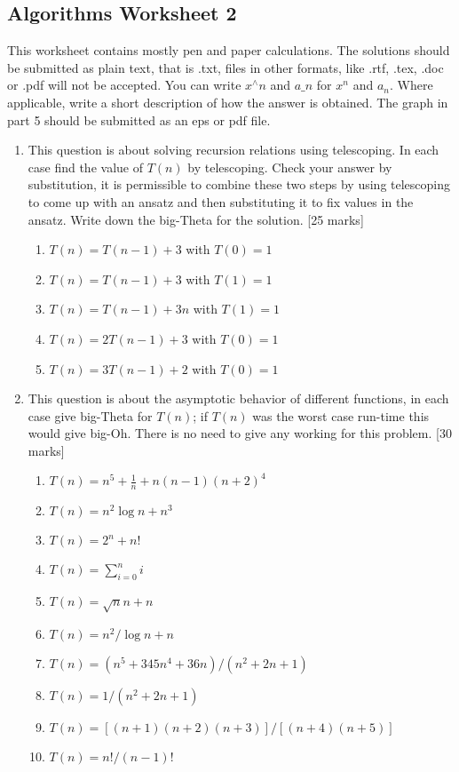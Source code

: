 \documentclass[11pt,a4paper]{scrartcl}
\begin{document}
\subsection*{Algorithms Worksheet 2}

This worksheet contains mostly pen and paper calculations. The
solutions should be submitted as plain text, that is .txt, files in
other formats, like .rtf, .tex, .doc or .pdf will not be accepted. You
can write $x^\wedge n$ and $a\_n$ for $x^n$ and $a_n$. Where
applicable, write a short description of how the answer is
obtained. The graph in part 5 should be submitted as an eps or pdf
file.

\begin{enumerate}

\item This question is about solving recursion relations using
  telescoping. In each case find the value of $T(n)$ by
  telescoping. Check your answer by substitution, it is permissible
  to combine these two steps by using telescoping to come up with an
  ansatz and then substituting it to fix values in the ansatz. Write down
  the big-Theta for the solution. [25 marks] 

\begin{enumerate}
\item $T(n)=T(n-1)+3$ with $T(0)=1$
\item $T(n)=T(n-1)+3$ with $T(1)=1$
\item $T(n)=T(n-1)+3n$ with $T(1)=1$
\item $T(n)=2T(n-1)+3$ with $T(0)=1$
\item $T(n)=3T(n-1)+2$ with $T(0)=1$
\end{enumerate}

\item This question is about the asymptotic behavior of
  different functions, in each case give big-Theta for $T(n)$; if
  $T(n)$ was the worst case run-time this would give big-Oh. There is
  no need to give any working for this problem.  [30 marks]

\begin{enumerate}

\item $T(n)=n^5+\frac{1}{n}+n(n-1)(n+2)^4$
\item $T(n)=n^2\log{n}+n^3$
\item $T(n)=2^n+n!$
\item $T(n)=\sum_{i=0}^ni$
\item $T(n)=\sqrt{n}n+n$
\item $T(n)=n^2/\log{n}+n$
\item $T(n)=(n^5+345n^4+36n)/(n^2+2n+1)$
\item $T(n)=1/(n^2+2n+1)$
\item $T(n)=[(n+1)(n+2)(n+3)]/[(n+4)(n+5)]$
\item $T(n)=n!/(n-1)!$


\end{enumerate}
\end{enumerate}
\end{document}

